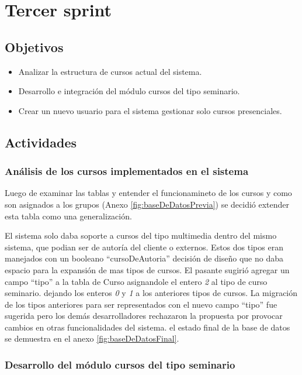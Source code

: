 \section{Tercer sprint} %
\label{sec:tercer_sprint}

\subsection{Objetivos}

\begin{itemize}
	\item Analizar la estructura de cursos actual del sistema.
	\item Desarrollo e integración del módulo cursos del tipo seminario.
	\item Crear un nuevo usuario para el sistema gestionar solo cursos presenciales.
\end{itemize}

\subsection{Actividades} %
\label{sub:actividades3}

\subsubsection{Análisis de los cursos implementados en el sistema}

Luego de examinar las tablas y entender el funcionamineto de los cursos y como son asignados a los grupos (Anexo \ref{fig:baseDeDatosPrevia}) se decidió extender esta tabla como una generalización.

El sistema solo daba soporte a cursos del tipo multimedia dentro del mismo sistema, que podian ser de autoría del cliente o externos. Estos dos tipos eran manejados con un booleano ``cursoDeAutoria'' decisión de diseño que no daba espacio para la expansión de mas tipos de cursos. El pasante sugirió agregar un campo ``tipo'' a la tabla de Curso asignandole el entero \emph{2} al tipo de curso seminario. dejando los enteros \emph{0} y \emph{1} a los anteriores tipos de cursos. La migración de los tipos anteriores para ser representados con el nuevo campo ``tipo'' fue sugerida pero los demás desarrolladores rechazaron la propuesta por provocar cambios en otras funcionalidades del sistema. el estado final de la base de datos se demuestra en el anexo \ref{fig:baseDeDatosFinal}.

\subsubsection{Desarrollo del módulo cursos del tipo seminario}

